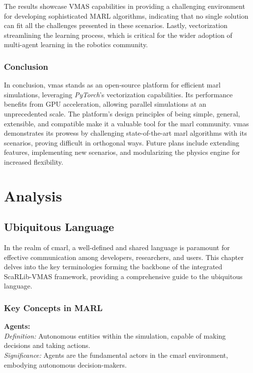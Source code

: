 \documentclass[12pt,a4paper,openright,twoside]{book}
\begin{document}
The results showcase VMAS capabilities in providing a challenging environment for developing sophisticated MARL algorithms, indicating that no single solution can fit all the challenges presented in these scenarios. Lastly, vectorization streamlining the learning process, which is critical for the wider adoption of multi-agent learning in the robotics community.

\subsection{Conclusion}

In conclusion, \ac{vmas} stands as an open-source platform for efficient \ac{marl} simulations, leveraging \emph{PyTorch}'s vectorization capabilities. Its performance benefits from GPU acceleration, allowing parallel simulations at an unprecedented scale. The platform's design principles of being simple, general, extensible, and compatible make it a valuable tool for the \ac{marl} community. \ac{vmas} demonstrates its prowess by challenging state-of-the-art \ac{marl} algorithms with its scenarios, proving difficult in orthogonal ways. Future plans include extending features, implementing new scenarios, and modularizing the physics engine for increased flexibility.

\newpage

\chapter{Analysis}
\label{chap:analysis}

\section{Ubiquitous Language}

In the realm of \ac{cmarl}, a well-defined and shared language is paramount for effective communication among developers, researchers, and users. This chapter delves into the key terminologies forming the backbone of the integrated ScaRLib-VMAS framework, providing a comprehensive guide to the ubiquitous language.

\subsection{Key Concepts in MARL}

\textbf{Agents:}\\
\textit{Definition:} Autonomous entities within the simulation, capable of making decisions and taking actions.\\
\textit{Significance:} Agents are the fundamental actors in the \ac{cmarl} environment, embodying autonomous decision-makers.\\
\end{document}
